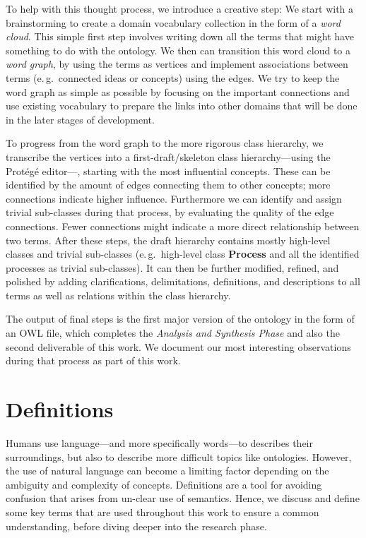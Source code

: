 \documentclass[a4paper, DIV=13, BCOR=0cm]{scrbook}
\newcommand{\eg}{e.\,g.\ }
\begin{document}
To help with this thought process, we introduce a creative step: We start with a brainstorming to create a domain vocabulary collection in the form of a \textit{word cloud}. This simple first step involves writing down all the terms that might have something to do with the ontology. We then can transition this word cloud to a \textit{word graph}, by using the terms as vertices and implement associations between terms (\eg connected ideas or concepts) using the edges. We try to keep the word graph as simple as possible by focusing on the important connections and use existing vocabulary to prepare the links into other domains that will be done in the later stages of development.

To progress from the word graph to the more rigorous class hierarchy, we transcribe the vertices into a first-draft/skeleton class hierarchy---using the Protégé editor---, starting with the most influential concepts. These can be identified by the amount of edges connecting them to other concepts; more connections indicate higher influence. Furthermore we can identify and assign trivial sub-classes during that process, by evaluating the quality of the edge connections. Fewer connections might indicate a more direct relationship between two terms. After these steps, the draft hierarchy contains mostly high-level classes and trivial sub-classes (\eg high-level class \textbf{Process} and all the identified processes as trivial sub-classes). It can then be further modified, refined, and polished by adding clarifications, delimitations, definitions, and descriptions to all terms as well as relations within the class hierarchy. 

The output of final steps is the first major version of the ontology in the form of an OWL file, which completes the \textit{Analysis and Synthesis Phase} and also the second deliverable of this work. We document our most interesting observations during that process as part of this work.

\section{Definitions}
Humans use language---and more specifically words---to describes their surroundings, but also to describe more difficult topics like ontologies. However, the use of natural language can become a limiting factor depending on the ambiguity and complexity of concepts. Definitions are a tool for avoiding confusion that arises from un-clear use of semantics. Hence, we discuss and define some key terms that are used throughout this work to ensure a common understanding, before diving deeper into the research phase.
\end{document}
